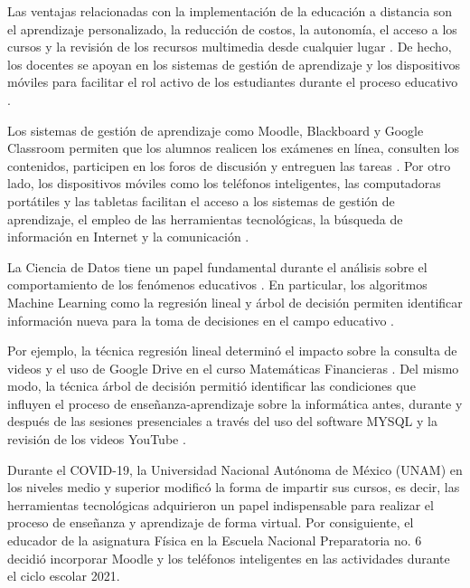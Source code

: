 \documentclass[spanish]{textolivre}
\begin{document}
Las ventajas relacionadas con la implementación de la educación a distancia son el aprendizaje personalizado, la reducción de costos, la autonomía, el acceso a los cursos y la revisión de los recursos multimedia desde cualquier lugar \cite{farsi_investigating_2022, karahisar_research_2022}. De hecho, los docentes se apoyan en los sistemas de gestión de aprendizaje y los dispositivos móviles para facilitar el rol activo de los estudiantes durante el proceso educativo \cite{farsi_investigating_2022, galarce-miranda_analysis_2022, verawati_enhancing_2022}.

Los sistemas de gestión de aprendizaje como Moodle, Blackboard y Google Classroom permiten que los alumnos realicen los exámenes en línea, consulten los contenidos, participen en los foros de discusión y entreguen las tareas \cite{farsi_investigating_2022, galarce-miranda_analysis_2022}. Por otro lado, los dispositivos móviles como los teléfonos inteligentes, las computadoras portátiles y las tabletas facilitan el acceso a los sistemas de gestión de aprendizaje, el empleo de las herramientas tecnológicas, la búsqueda de información en Internet y la comunicación \cite{farsi_investigating_2022, rysbayeva_students_2022, verawati_enhancing_2022}.

La Ciencia de Datos tiene un papel fundamental durante el análisis sobre el comportamiento de los fenómenos educativos \cite{chadaga_battling_2021, khakpour_convergence_2021, salas-rueda_use_2021}. En particular, los algoritmos Machine Learning como la regresión lineal y árbol de decisión permiten identificar información nueva para la toma de decisiones en el campo educativo \cite{alenezi_utilizing_2020, khakpour_convergence_2021}.

Por ejemplo, la técnica regresión lineal determinó el impacto sobre la consulta de videos y el uso de Google Drive en el curso Matemáticas Financieras \cite{salas-rueda_use_2021}. Del mismo modo, la técnica árbol de decisión permitió identificar las condiciones que influyen el proceso de enseñanza-aprendizaje sobre la informática antes, durante y después de las sesiones presenciales a través del uso del software MYSQL y la revisión de los videos YouTube \cite{salas-rueda_use_2020}.

Durante el COVID-19, la Universidad Nacional Autónoma de México (UNAM) en los niveles medio y superior modificó la forma de impartir sus cursos, es decir, las herramientas tecnológicas adquirieron un papel indispensable para realizar el proceso de enseñanza y aprendizaje de forma virtual. Por consiguiente, el educador de la asignatura Física en la Escuela Nacional Preparatoria no. 6 decidió incorporar Moodle y los teléfonos inteligentes en las actividades durante el ciclo escolar 2021.
\end{document}
